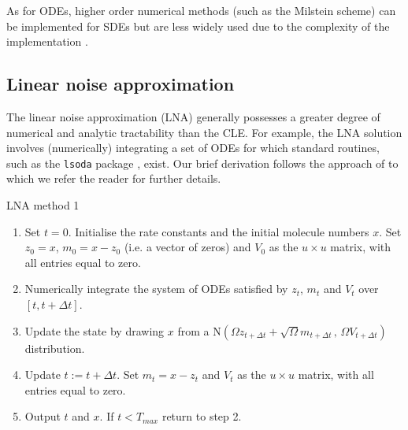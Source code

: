 \documentclass[12pt, DIV12]{scrartcl}
\begin{document}
As for ODEs, higher order numerical methods (such as the Milstein scheme) can be
implemented for SDEs but are less widely used due to the complexity of the
implementation \cite{Kloeden92}.

\subsection{Linear noise approximation}

The linear noise approximation (LNA) generally possesses a greater degree of
numerical and analytic tractability than the CLE. For example, the LNA solution
involves (numerically) integrating a set of ODEs for which standard routines,
such as the \texttt{lsoda} package \citep{petzold83}, exist. Our brief
derivation follows the approach of \cite{Wilkinson06} to which we refer the
reader for further details.

\begin{algorithm}[t]
\caption{LNA method 1}\label{A4}
\begin{enumerate}
\item Set $t=0$. Initialise the rate constants and the initial molecule numbers
  $x$. Set $z_{0}=x$, $m_{0}=x-z_{0}$ (i.e. a vector of zeros) and $V_{0}$ as
  the $u\times u$ matrix, with all entries equal to zero.
\item Numerically integrate the system of ODEs satisfied by $z_t$, $m_t$ and $V_t$ over 
$[t,t+\Delta t]$.
\item Update the state by drawing $x$ from a $\textrm{N}\left(\Omega z_{t+\Delta t}+\sqrt{\Omega}m_{t+\Delta t}\,,\, \Omega V_{t+\Delta t}\right)$ 
distribution.
\item Update $t:=t+\Delta t$. Set $m_{t}=x-z_{t}$ and 
$V_{t}$ as the $u\times u$ matrix, with all entries equal to zero.  
\item Output $t$ and $x$. If $t<T_{max}$ return to step 2.
\end{enumerate}
\end{algorithm}
\end{document}
